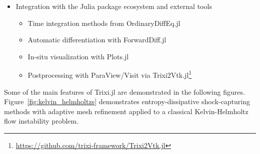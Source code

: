 \documentclass{juliacon}
\newcommand{\trixi}{Trixi.jl\xspace}
\begin{document}
\begin{itemize}
  \item Integration with the Julia package ecosystem and external tools
  \begin{itemize}
    \item Time integration methods from OrdinaryDiffEq.jl
    \item Automatic differentiation with ForwardDiff.jl
    \item In-situ visualization with Plots.jl
    \item Postprocessing with ParaView/Visit via Trixi2Vtk.jl\footnote{\url{https://github.com/trixi-framework/Trixi2Vtk.jl}}
  \end{itemize}
\end{itemize}

Some of the main features of \trixi are demonstrated in the following figures.
Figure~\ref{fig:kelvin_helmholtzs} demonstrates entropy-dissipative shock-capturing
methods with adaptive mesh refinement applied to a classical Kelvin-Helmholtz
flow instability problem.
\end{document}
